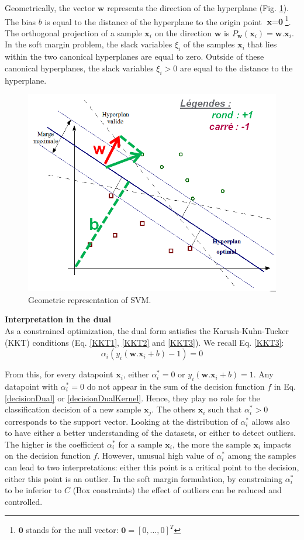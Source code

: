 Geometrically, the vector $\textbf{w}$ represents the direction of the hyperplane (Fig. \ref{fig:SVM_interpretation}). The bias $b$ is equal to the distance of the hyperplane to the origin point $\textbf{x}=\textbf{0}$\footnote{$\textbf{0}$ stands for the null vector: $\textbf{0} = [0, \ldots ,0]^T$}. The orthogonal projection of a sample $\textbf{x}_i$ on the direction $\textbf{w}$ is $P_\textbf{w}(\textbf{x}_i) = \textbf{w}.\textbf{x}_i$. In the soft margin problem, the slack variables $\xi_i$ of the samples $\textbf{x}_i$ that lies within the two canonical hyperplanes are equal to zero. Outside of these canonical hyperplanes, the slack variables $\xi_i > 0$ are equal to the distance to the hyperplane.


\begin{figure}[h!]
	\centering
	\includegraphics[width=0.5\linewidth]{images/SVM_interpretation}
	\caption{Geometric representation of SVM.}
	\label{fig:SVM_interpretation}
\end{figure}


\noindent \textbf{Interpretation in the dual} \\
As a constrained optimization, the dual form satisfies the
Karush-Kuhn-Tucker (KKT) conditions (Eq. \ref{KKT1}, \ref{KKT2} and \ref{KKT3}). We recall Eq. \ref{KKT3}:
\begin{equation*}
	\alpha_i (y_i(\textbf{w}.\textbf{x}_i+b)-1) = 0
\end{equation*}

From this, for every datapoint $\textbf{x}_i$, either $\alpha_i^* = 0$ or $y_i(\textbf{w}.\textbf{x}_i+b) = 1$. Any datapoint with $\alpha_i^* = 0$ do not appear in the sum of the decision function $f$ in Eq. \ref{decisionDual} or \ref{decisionDualKernel}. Hence, they play no role for the classification decision of a new sample $\textbf{x}_j$. The others $\textbf{x}_i$ such that $\alpha_i^* > 0$ corresponds to the support vector. Looking at the distribution of $\alpha_i^*$ allows also to have either a better understanding of the datasets, or either to detect outliers. The higher is the coefficient $\alpha_i^*$ for a sample $\textbf{x}_i$, the more the sample $\textbf{x}_i$ impacts on the decision function $f$. However, unusual high value of $\alpha_i^*$ among the samples can lead to two interpretations: either this point is a critical point to the decision, either this point is an outlier. In the soft margin formulation, by constraining $\alpha_i^*$ to be inferior to $C$ (Box constraints) the effect of outliers can be reduced and controlled. 





